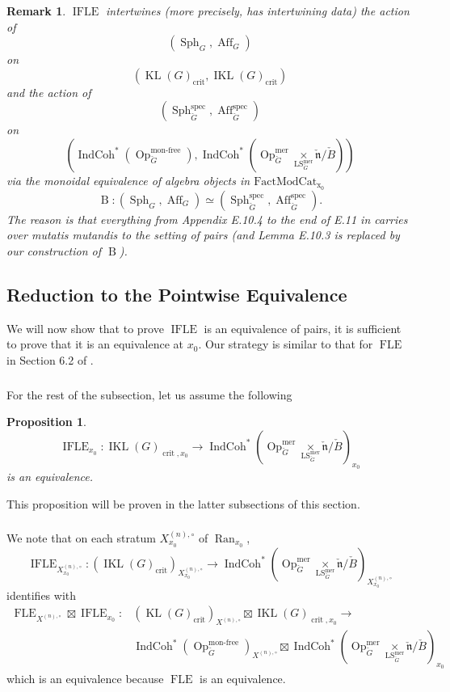 \documentclass[10pt,a4paper]{amsart}
\newtheorem{prop}[subsubsection]{Proposition}
\newtheorem{rem}[subsubsection]{Remark}
\newcommand{\on}[1]{\operatorname{#1}}
\newcommand{\IndCoh}{\on{IndCoh}}
\newcommand{\KL}{\on{KL}(G)_{\on{crit}}}
\newcommand{\IKL}{\on{IKL}(G)_{\on{crit}}}
\newcommand{\IKLx}{\on{IKL}(G)_{\on{crit}, x_0}}
\newcommand{\Gcheck}{\check{G}}
\newcommand{\ncheck}{\check{\mathfrak{n}}}
\newcommand{\Bcheck}{\check{B}}
\newcommand{\Ran}{\on{Ran}}
\newcommand{\FactModCat}{\on{FactModCat_{x_0}}}
\newcommand{\sssec}[1]{\subsubsection{}}
\begin{document}
\begin{rem}
$\on{IFLE}$ intertwines (more precisely, has intertwining \emph{data}) the action of 
$$
(\on{Sph}_{G}, \on{Aff}_G)
$$ on 
$$
(\KL, \IKL)
$$
and the action of 
$$
(\on{Sph}_{\Gcheck}^{\on{spec}}, \on{Aff}_{\Gcheck}^{\on{spec}})
$$ on 
$$
(\IndCoh^*(\on{Op}_{\Gcheck}^{\on{mon-free}}), \IndCoh^*(\on{Op}_{\Gcheck}^{\on{mer}} \underset{\on{LS}_{\Gcheck}^{\on{mer}}}{\times} \ncheck/\Bcheck))
$$
via the monoidal equivalence of algebra objects in $\FactModCat$ 
$$
\on{B} : (\on{Sph}_{G}, \on{Aff}_G) \simeq (\on{Sph}_{\Gcheck}^{\on{spec}}, \on{Aff}_{\Gcheck}^{\on{spec}}).
$$
The reason is that everything from Appendix E.10.4 to the end of E.11 in \cite{GLC2} carries over \emph{mutatis mutandis} to the setting of pairs (and Lemma E.10.3 is replaced by our construction of $\on{B}$).
\end{rem}

\subsection{Reduction to the Pointwise Equivalence} \label{Reduction to the Pointwise Equivalence}
We will now show that to prove $\on{IFLE}$ is an equivalence of pairs, it is sufficient to prove that it is an equivalence at $x_0$. Our strategy is similar to that for $\on{FLE}$ in Section 6.2 of \cite{GLC2}.

\sssec{}
For the rest of the subsection, let us assume the following
\begin{prop} \label{pointwise IFLE}
$$
\on{IFLE}_{x_0} : \IKLx \to \IndCoh^*(\on{Op}_{\Gcheck}^{\on{mer}} \underset{\on{LS}_{\Gcheck}^{\on{mer}}}{\times} \ncheck/\Bcheck)_{x_0}
$$
is an equivalence.
\end{prop}
This proposition will be proven in the latter subsections of this section.

\sssec{}
We note that on each stratum $X_{x_0}^{(n), \circ}$ of $\Ran_{x_0}$,
$$
\on{IFLE}_{X_{x_0}^{(n), \circ}} : (\IKL)_{X_{x_0}^{(n), \circ}} \to \IndCoh^*(\on{Op}_{\Gcheck}^{\on{mer}} \underset{\on{LS}_{\Gcheck}^{\on{mer}}}{\times} \ncheck/\Bcheck)_{X_{x_0}^{(n), \circ}}
$$
identifies with
\begin{align}
\on{FLE}_{X^{(n), \circ}} \boxtimes \on{IFLE}_{x_0} : &(\KL)_{X^{(n), \circ}} \boxtimes \IKLx \to \\
&\IndCoh^*(\on{Op}_{\Gcheck}^{\on{mon-free}})_{X^{(n), \circ}} \boxtimes \IndCoh^*(\on{Op}_{\Gcheck}^{\on{mer}} \underset{\on{LS}_{\Gcheck}^{\on{mer}}}{\times} \ncheck/\Bcheck)_{x_0}
\end{align}
which is an equivalence because $\on{FLE}$ is an equivalence.
\end{document}
